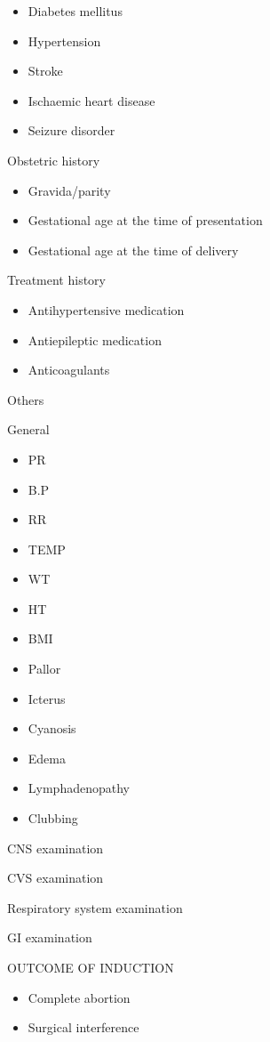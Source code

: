 \documentclass[14pt]{extarticle}
\begin{document}
\begin{itemize}
\item Diabetes mellitus
\item Hypertension
\item Stroke
\item Ischaemic heart disease
\item Seizure disorder
\end{itemize}

Obstetric history

\begin{itemize}
\item  Gravida/parity
\item  Gestational age at the time of presentation
\item  Gestational age at the time of delivery
\end{itemize}

Treatment history

\begin{itemize}
\item  Antihypertensive medication
\item  Antiepileptic medication
\item  Anticoagulants
\end{itemize}

Others

General

\begin{itemize}
\item PR
\item B.P
\item RR
\item TEMP
\item WT
\item HT
\item BMI
\item Pallor
\item Icterus
\item Cyanosis
\item Edema
\item Lymphadenopathy
\item Clubbing
\end{itemize}

CNS examination

CVS examination

Respiratory system examination

GI examination

OUTCOME OF INDUCTION

\begin{itemize}
\item Complete abortion
\item Surgical interference
\end{itemize}
\end{document}
